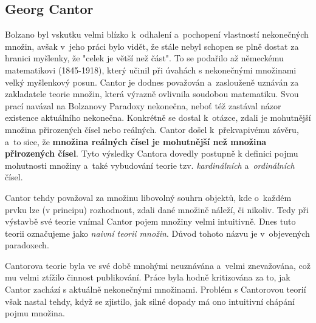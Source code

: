 \subsection{Georg Cantor}\label{subsec:cantor}
Bolzano byl vskutku velmi blízko k~odhalení a~pochopení vlastností nekonečných množin, avšak v~jeho práci bylo vidět, že stále nebyl schopen se plně dostat za hranici myšlenky, že "celek je větší než část". To se podařilo až německému matematikovi  \mbox{(1845-1918)}, který učinil při úvahách s nekonečnými množinami velký myšlenkový posun. Cantor je dodnes považován a~zaslouženě uznáván za zakladatele teorie množin, která výrazně ovlivnila soudobou matematiku. Svou prací navázal na Bolzanovy Paradoxy nekonečna, neboť též zastával názor existence aktuálního nekonečna. Konkrétně se dostal k~otázce, zdali je mohutnější množina přirozených čísel nebo reálných. Cantor došel k~překvapivému závěru, a~to sice, že \textbf{množina reálných čísel je mohutnější než množina přirozených čísel}. Tyto výsledky Cantora dovedly postupně k definici pojmu mohutnosti množiny a~také vybudování teorie tzv. \emph{kardinálních} a~\emph{ordinálních} čísel.\par
Cantor tehdy považoval za množinu libovolný souhrn objektů, kde o~každém prvku lze (v principu) rozhodnout, zdali dané množině náleží, či nikoliv. Tedy při výstavbě své teorie vnímal Cantor pojem množiny velmi intuitivně. Dnes tuto teorii označujeme jako \emph{naivní teorii množin}. Důvod tohoto názvu je v~objevených paradoxech.\par
Cantorova teorie byla ve své době mnohými neuznávána a~velmi znevažována, což mu velmi ztížilo činnost publikování. Práce byla hodně kritizována za to, jak Cantor zachází s aktuálně nekonečnými množinami. Problém s Cantorovou teorií však nastal tehdy, když se zjistilo, jak silné dopady má ono intuitivní chápání pojmu množina.

